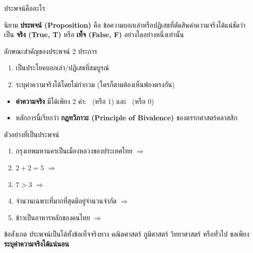 \begin{frame}{ประพจน์คืออะไร}
  \begin{block}{นิยาม}
    \textbf{ประพจน์ (Proposition)} คือ ข้อความบอกเล่าหรือปฏิเสธที่ตัดสินค่าความจริงได้แน่ชัดว่า
    เป็น \textbf{จริง (True, T)} หรือ \textbf{เท็จ (False, F)} อย่างใดอย่างหนึ่งเท่านั้น
  \end{block}
  \vspace{0.4em}
  ลักษณะสำคัญของประพจน์ 2 ประการ
  \begin{enumerate}
    \item เป็นประโยคบอกเล่า/ปฏิเสธที่สมบูรณ์
    \item ระบุค่าความจริงได้โดยไม่กำกวม (ใครก็ตามต้องเห็นพ้องตรงกัน)
  \end{enumerate}
  \vspace{0.4em}
  \begin{itemize}
    \item \textbf{ค่าความจริง}  มีได้เพียง 2 ค่า: \TT\ (หรือ 1) และ \FF\ (หรือ 0)
    \item หลักการนี้เรียกว่า \textbf{กฎทวิภาวะ (Principle of Bivalence)} ของตรรกศาสตร์คลาสสิก
  \end{itemize}
\end{frame}

\begin{frame}{ตัวอย่างที่เป็นประพจน์}
  \begin{enumerate}
    \item กรุงเทพมหานครเป็นเมืองหลวงของประเทศไทย \hfill $\Rightarrow$ \TT
    \item $2 + 2 = 5$ \hfill $\Rightarrow$ \FF
    \item $7 > 3$ \hfill $\Rightarrow$ \TT
    \item จำนวนเฉพาะที่มากที่สุดมีอยู่จำนวนจำกัด \hfill $\Rightarrow$ \FF
    \item ข้าวเป็นอาหารหลักของคนไทย \hfill $\Rightarrow$ \TT
  \end{enumerate}
  \vspace{0.8em}
  \begin{block}{ข้อสังเกต}
    ประพจน์เป็นได้ทั้งข้อเท็จจริงทาง คณิตศาสตร์ ภูมิศาสตร์ วิทยาศาสตร์ หรือทั่วไป
    ขอเพียง \textbf{ระบุค่าความจริงได้แน่นอน}
  \end{block}
\end{frame}

